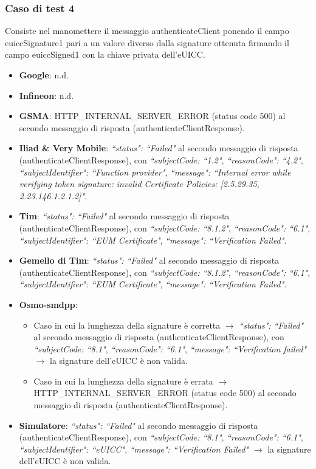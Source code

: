 \documentclass[10pt, oneside]{book}
\begin{document}
\subsubsection{Caso di test 4}
Consiste nel manomettere il messaggio authenticateClient ponendo il campo euiccSignature1 pari a un valore diverso dalla signature ottenuta firmando il campo euiccSigned1 con la chiave privata dell'eUICC.
\begin{itemize}
\item \textbf{Google}: n.d.
\item \textbf{Infineon}: n.d.
\item \textbf{GSMA}: HTTP\_INTERNAL\_SERVER\_ERROR (status code 500) al secondo messaggio di risposta (authenticateClientResponse).
\item \textbf{Iliad \& Very Mobile}: \textit{``status": ``Failed"} al secondo messaggio di risposta (authenticateClientResponse), con \textit{``subjectCode: ``1.2"}, \textit{``reasonCode": ``4.2"}, \textit{``subjectIdentifier": ``Function provider"}, \textit{``message": ``Internal error while verifying token signature: invalid Certificate Policies: [2.5.29.35, 2.23.146.1.2.1.2]"}.
\item \textbf{Tim}: \textit{``status": ``Failed"} al secondo messaggio di risposta (authenticateClientResponse), con \textit{``subjectCode: ``8.1.2"}, \textit{``reasonCode": ``6.1"}, \textit{``subjectIdentifier": ``EUM Certificate"}, \textit{``message": ``Verification Failed"}.
\item \textbf{Gemello di Tim}: \textit{``status": ``Failed"} al secondo messaggio di risposta (authenticateClientResponse), con \textit{``subjectCode: ``8.1.2"}, \textit{``reasonCode": ``6.1"}, \textit{``subjectIdentifier": ``EUM Certificate"}, \textit{``message": ``Verification Failed"}.
\item \textbf{Osmo-smdpp}: 
\begin{itemize}
\item Caso in cui la lunghezza della signature è corretta $\rightarrow$ \textit{``status": ``Failed"} al secondo messaggio di risposta (authenticateClientResponse), con \textit{``subjectCode: ``8.1"}, \textit{``reasonCode": ``6.1"}, \textit{``message": ``Verification failed"} $\rightarrow$ la signature dell'eUICC è non valida.
\item Caso in cui la lunghezza della signature è errata $\rightarrow$ HTTP\_INTERNAL\_SERVER\_ERROR (status code 500) al secondo messaggio di risposta (authenticateClientResponse).
\end{itemize}
\item \textbf{Simulatore}: \textit{``status": ``Failed"} al secondo messaggio di risposta (authenticateClientResponse), con \textit{``subjectCode: ``8.1"}, \textit{``reasonCode": ``6.1"}, \textit{``subjectIdentifier": ``eUICC"}, \textit{``message": ``Verification Failed"} $\rightarrow$ la signature dell'eUICC è non valida.
\end{itemize}
\end{document}
